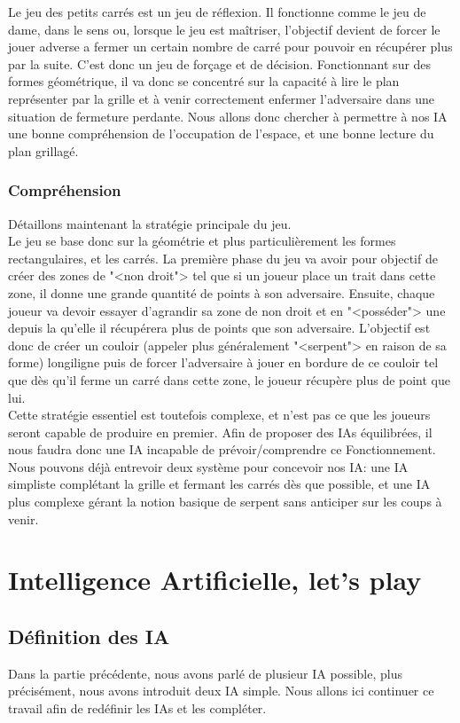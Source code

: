 \documentclass[a4paper,12pt]{report}
\begin{document}
Le jeu des petits carr\'es est un jeu de r\'eflexion. Il fonctionne comme le jeu de dame, dans le sens ou, lorsque le jeu est ma\^itriser, l'objectif devient de forcer le jouer adverse a fermer un certain nombre de carr\'e pour pouvoir en r\'ecup\'erer plus par la suite. C'est donc un jeu de for\c{c}age et de d\'ecision. Fonctionnant sur des formes g\'eom\'etrique, il va donc se concentr\'e sur la capacit\'e \`a lire le plan repr\'esenter par la grille et \`a venir correctement enfermer l'adversaire dans une situation de fermeture perdante. Nous allons donc chercher \`a permettre \`a nos IA une bonne compr\'ehension de l'occupation de l'espace, et une bonne lecture du plan grillag\'e.

\section{Compr\'ehension}

D\'etaillons maintenant la strat\'egie principale du jeu.\\
Le jeu se base donc sur la g\'eom\'etrie et plus particuli\`erement les formes rectangulaires, et les carr\'es. La premi\`ere phase du jeu va avoir pour objectif de cr\'eer des zones de "<non droit"> tel que si un joueur place un trait dans cette zone, il donne une grande quantit\'e de points \`a son adversaire. Ensuite, chaque joueur va devoir essayer d'agrandir sa zone de non droit et en "<poss\'eder"> une depuis la qu'elle il r\'ecup\'erera plus de points que son adversaire. L'objectif est donc de cr\'eer un couloir (appeler plus g\'en\'eralement "<serpent"> en raison de sa forme) longiligne puis de forcer l'adversaire \`a jouer en bordure de ce couloir tel que d\`es qu'il ferme un carr\'e dans cette zone, le joueur r\'ecup\`ere plus de point que lui. \\
Cette strat\'egie essentiel est toutefois complexe, et n'est pas ce que les joueurs seront capable de produire en premier. Afin de proposer des IAs \'equilibr\'ees,  il nous faudra donc une IA incapable de pr\'evoir/comprendre ce Fonctionnement. \\
Nous pouvons d\'ej\`a entrevoir deux syst\`eme pour concevoir nos IA: une IA simpliste compl\'etant la grille et fermant les carr\'es d\`es que possible, et une IA plus complexe g\'erant la notion basique de serpent sans anticiper sur les coups \`a venir.

\part{Intelligence Artificielle, let's play}

\chapter{D\'efinition des IA}

Dans la partie pr\'ec\'edente, nous avons parl\'e de plusieur IA possible, plus pr\'ecis\'ement, nous avons introduit deux IA simple. Nous allons ici continuer ce travail afin de red\'efinir les IAs et les compl\'eter.
\end{document}
